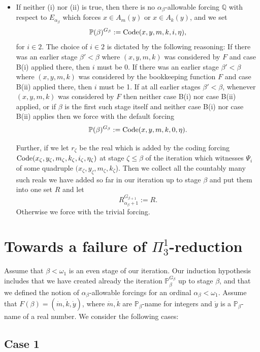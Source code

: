 \documentclass[a4paper,11pt]{article}
\newcommand{\forceP}{\mathbb{P}}
\newcommand{\forceQ}{\mathbb{Q}}
\begin{document}
\begin{itemize}
\begin{itemize}
\item[(iii)] If neither (i) nor (ii) is true, then there is no $\alpha_{\beta}$-allowable forcing $\forceQ$ with respect to $E_{\alpha_{\beta}}$ which forces $x \in A_m(y)$ or $x \in A_k(y)$, and we set
\[ \forceP(\beta)^{G_{\beta}}:=\hbox{Code} ({x}, {y}, m,k, i,\eta),\]
for $i \in 2$. The choice of $i \in 2$ is dictated by the following reasoning: If there was an earlier stage $\beta' < \beta$ where $(x,y,m,k)$ was considered by $F$ and case B(i) applied there, then $i$ must be $0$. If there was an earlier stage $\beta' < \beta$ where $(x,y,m,k)$ was considered by the bookkeeping function $F$ and case B(ii) applied there, then $i$ must be 1. If at all earlier stages $\beta' < \beta$, whenever $(x,y,m,k)$ was considered by $F$ then neither case B(i) nor case B(ii) applied, or if $\beta$ is the first such stage itself  and neither case B(i)  nor case B(ii) applies then we force with the default forcing
\[ \forceP(\beta)^{G_{\beta}}:=\hbox{Code} ({x}, {y}, m,k, 0,\eta).\]

Further, if we let $r_{\zeta}$ be the real which is added by the coding forcing $\hbox{Code} ({x}_{\zeta}, {y}_{\zeta}, m_{\zeta},k_{\zeta}, i_{\zeta},\eta_{\zeta})$ at stage $\zeta \le \beta$ of the iteration which witnesses $\Psi_i$ of some quadruple $(x_{\zeta},y_{\zeta},m_{\zeta},k_{\zeta}$). Then we collect all the countably many such reals we have added so far in our iteration up to stage $\beta$ and put them into one set $R$ and let
\[ R^{G_{\beta+1}}_{\alpha_{\beta}+1 }:= R . \] 
Otherwise we force with the trivial forcing.
\end{itemize}
 \end{itemize}
 

\section{Towards a failure of $\Pi^1_3$-reduction}



Assume that $\beta < \omega_1$ is an even stage of our iteration. Our induction hypothesis includes that we have created already the iteration $\forceP_{\beta}^{G_{\beta}}$ up to stage $\beta$, and that we defined the notion of $\alpha_{\beta}$-allowable forcings for an ordinal $\alpha_{\beta} < \omega_1$. Assume that  $F(\beta) = (\dot{m},\dot{k},\dot{y})$, where $\dot{m},\dot{k}$ are $\forceP_{\beta}$-name for integers and $\dot{y}$ is a $\forceP_{\beta}$-name of a real number. We consider the following cases:
\subsection{Case 1}
\end{document}
